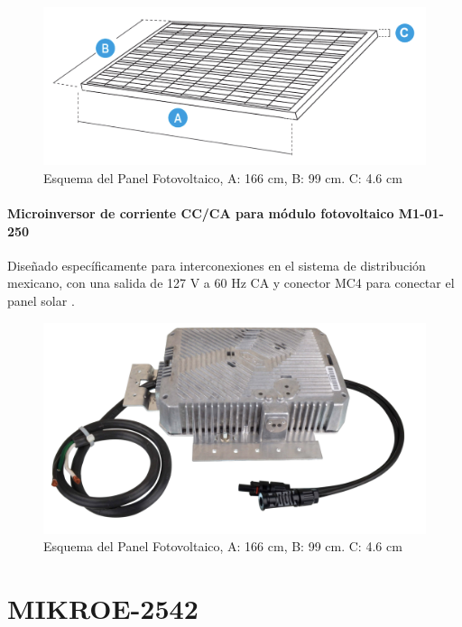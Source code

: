 \begin{figure}[H]
	\centering
	\includegraphics[scale=.25]{Capitulo2/images/panel.png}
	\caption{Esquema del Panel Fotovoltaico, A: 166 cm, B: 99 cm. C: 4.6 cm}
	\label{fig:diagrama_dispensador}
\end{figure}

\paragraph{Microinversor de corriente CC/CA para módulo fotovoltaico M1-01-250}
Diseñado específicamente para interconexiones en el sistema de distribución mexicano, con una salida de 127 V a 60 Hz CA y conector MC4 para conectar el panel solar \citep{MarcoTeorico3}.

\begin{figure}[H]
	\centering
	\includegraphics[scale=.25]{Capitulo2/images/microinversor.png}
	\caption{Esquema del Panel Fotovoltaico, A: 166 cm, B: 99 cm. C: 4.6 cm}
	\label{fig:diagrama_dispensador}
\end{figure}
 
\section{MIKROE-2542}

